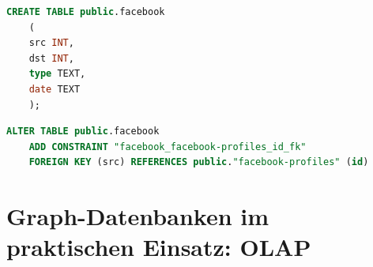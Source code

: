 \begin{lstlisting}[language=SQL,caption=Anlegen der Tabelle facebook,frame=single]
    CREATE TABLE public.facebook
    (
    src INT,
    dst INT,
    type TEXT,
    date TEXT
    );
\end{lstlisting}

\begin{lstlisting}[language=SQL,caption=Hinzufügen von Fremdschlüsseln,frame=single]
    ALTER TABLE public.facebook
    ADD CONSTRAINT "facebook_facebook-profiles_id_fk"
    FOREIGN KEY (src) REFERENCES public."facebook-profiles" (id)
\end{lstlisting}

\section{Graph-Datenbanken im praktischen Einsatz: OLAP}
